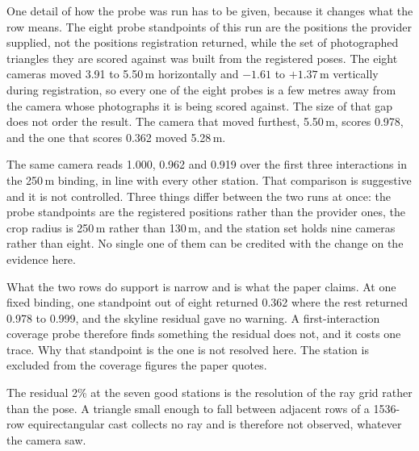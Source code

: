 \documentclass[journal]{IEEEtran}
\begin{document}
One detail of how the probe was run has to be given, because it changes what the
row means. The eight probe standpoints of this run are the positions the
provider supplied, not the positions registration returned, while the set of
photographed triangles they are scored against was built from the registered
poses. The eight cameras moved 3.91 to 5.50\,m horizontally and $-1.61$ to
$+1.37$\,m vertically during registration, so every one of the eight probes is a
few metres away from the camera whose photographs it is being scored against.
The size of that gap does not order the result. The camera that moved furthest,
5.50\,m, scores 0.978, and the one that scores 0.362 moved 5.28\,m.

The same camera reads 1.000, 0.962 and 0.919 over the first three interactions
in the 250\,m binding, in line with every other station. That comparison is
suggestive and it is not controlled. Three things differ between the two runs at
once: the probe standpoints are the registered positions rather than the
provider ones, the crop radius is 250\,m rather than 130\,m, and the station set
holds nine cameras rather than eight. No single one of them can be credited with
the change on the evidence here.

What the two rows do support is narrow and is what the paper claims. At one
fixed binding, one standpoint out of eight returned 0.362 where the rest
returned 0.978 to 0.999, and the skyline residual gave no warning. A
first-interaction coverage probe therefore finds something the residual does
not, and it costs one trace. Why that standpoint is the one is not resolved
here. The station is excluded from the coverage figures the paper quotes.

The residual 2\% at the seven good stations is the resolution of the ray grid
rather than the pose. A triangle small enough to fall between adjacent rows of a
1536-row equirectangular cast collects no ray and is therefore not observed,
whatever the camera saw.
\end{document}
